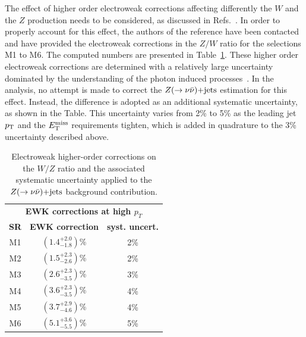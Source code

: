 The effect of higher order electroweak corrections affecting differently the $W$ and the $Z$ production needs to be considered, as discussed in Refs.~\cite{Denner:2009gj,Denner:2011vu,Denner:2012ts}.
In order to properly account for this effect, the authors of the reference have been contacted and have provided the electroweak corrections in the $Z/W$ ratio for the selections M1 to M6.
The computed numbers are presented in Table~\ref{tab:ewkcorrTheorists}.
These higher order electroweak corrections are determined with a relatively large uncertainty dominated by the understanding of the photon induced processes~\cite{Denner:2009gj,Denner:2011vu,Denner:2012ts}.
In the analysis, no attempt is made to correct the $\znn$ estimation for this effect.
Instead, the difference is adopted as an additional systematic uncertainty, as shown in the Table.
This uncertainty varies from 2\% to 5\% as the leading jet $p_{\mathrm{T}}$ and the $E_{\mathrm{T}}^{\mathrm{miss}}$ requirements tighten, which is added in quadrature to the 3\% uncertainty described above.

\begin{table}[!htb]
\begin{center}
\vspace*{1em}
\begin{tabular}{ccc}
\hline\hline
\multicolumn{3}{c}{{\bf EWK corrections at high $p_T$}} \\
\textbf{\phantom{00}SR\phantom{00}} & \textbf{EWK correction} & \textbf{syst. uncert.}            \\
\hline
M1 & $\left(1.4 ^{+2.0}_{-1.8}\right)$\% & 2\%\\ [0.5ex]  
M2 & $\left(1.5  ^{+2.3}_{-2.6}\right)$\% & 2\%\\ [0.5ex] 
M3 & $\left(2.6  ^{+2.3}_{-3.5}\right)$\%& 3\% \\ [0.5ex] 
M4 & $\left(3.6 ^{+2.3}_{-3.5}\right)$\%& 4\% \\[0.5ex]   
M5 & $\left(3.7 ^{+2.9}_{-4.6}\right)$\%& 4\% \\[0.5ex]   
M6 & $\left(5.1 ^{+3.6}_{-5.5}\right)$\% & 5\%\\ [0.5ex] \hline\hline
\end{tabular}
\end{center}
\caption[Uncertainty adopted on the $\znn$ estimation associated to higher order electroweak radiative corrections with the $W/Z$ ratio.]
{Electroweak higher-order corrections on the $W/Z$ ratio and the associated systematic uncertainty applied to the $\znn$ background contribution.}
\label{tab:ewkcorrTheorists}
\end{table}
